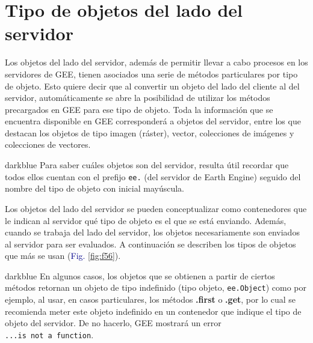 \documentclass[
  12pt,
  letterpaper,
  twoside]{book}
\newcommand\boldpurple[1]{\textcolor{darkpurple}{\textbf{#1}}}
\begin{document}
\hypertarget{tipo-de-objetos-del-lado-del-servidor}{%
\section{Tipo de objetos del lado del servidor}\label{tipo-de-objetos-del-lado-del-servidor}}

Los objetos del lado del servidor, además de permitir llevar a cabo procesos en los servidores de GEE, tienen asociados una serie de métodos particulares por tipo de objeto. Esto quiere decir que al convertir un objeto del lado del cliente al del servidor, automáticamente se abre la posibilidad de utilizar los métodos precargados en GEE para ese tipo de objeto. Toda la información que se encuentra disponible en GEE corresponderá a objetos del servidor, entre los que destacan los objetos de tipo imagen (ráster), vector, colecciones de imágenes y colecciones de vectores.

\begin{bluebox2}

\begin{awesomeblock}{5pt}{\faLightbulb}{darkblue}
Para saber cuáles objetos son del servidor, resulta útil recordar que todos ellos cuentan con el prefijo \texttt{ee.} (del servidor de Earth Engine) seguido del nombre del tipo de objeto con inicial mayúscula.

\end{awesomeblock}

\end{bluebox2}

Los objetos del lado del servidor se pueden conceptualizar como contenedores que le indican al servidor qué tipo de objeto es el que se está enviando. Además, cuando se trabaja del lado del servidor, los objetos necesariamente son enviados al servidor para ser evaluados. A continuación se describen los tipos de objetos que más se usan (\textcolor{darkblue}{Fig.} \ref{fig:f56}).

\begin{bluebox2}

\begin{awesomeblock}{5pt}{\faLightbulb}{darkblue}
En algunos casos, los objetos que se obtienen a partir de ciertos métodos retornan un objeto de tipo indefinido (tipo objeto, \texttt{ee.Object}) como por ejemplo, al usar, en casos particulares, los métodos \boldpurple{.first} o \boldpurple{.get}, por lo cual se recomienda meter este objeto indefinido en un contenedor que indique el tipo de objeto del servidor. De no hacerlo, GEE mostrará un error \texttt{...is\ not\ a\ function}.

\end{awesomeblock}

\end{bluebox2}
\end{document}
